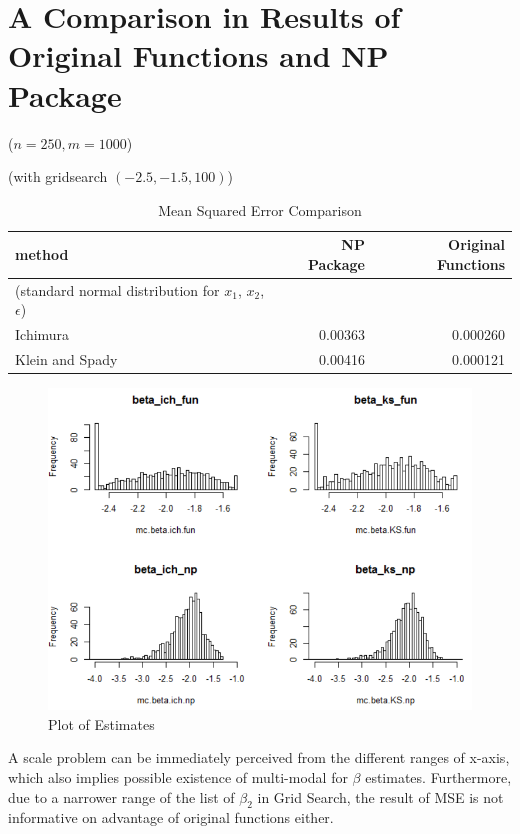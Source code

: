 \documentclass[a4paper]{article}
\begin{document}
\section{A Comparison in Results of Original Functions and NP Package}
($n = 250, m = 1000$)

\begin{table}[H]
\caption {Mean Squared Error Comparison} \label{tab:mean squared error}

(with gridsearch $(-2.5, -1.5, 100)$)

\begin{tabular}{l r r}

\toprule
\textbf{method} & \textbf{NP Package} & \textbf{Original Functions} \tabularnewline\midrule
(standard normal distribution for $x_1$, $x_2$, $\epsilon$) & &
\tabularnewline
Ichimura & 0.00363 & 0.000260 \tabularnewline
Klein and Spady & 0.00416 & 0.000121 \tabularnewline

\bottomrule
\end{tabular}
\end{table}

\begin{figure}[h!]
  \caption{Plot of Estimates}
  \includegraphics[width=\linewidth]{comparison_np_fun_plot.png}
 
  \label{fig:plot of estimates}
\end{figure}

A scale problem can be immediately perceived from the different ranges of x-axis, which also implies possible existence of multi-modal for $\beta$ estimates. Furthermore, due to a narrower range of the list of $\beta_2$ in Grid Search, the result of MSE is not informative on advantage of original functions either. 
\end{document}
